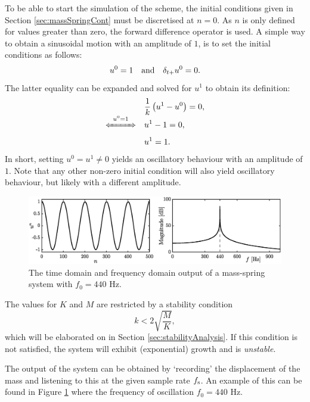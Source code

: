 To be able to start the simulation of the scheme, the initial conditions given in Section \ref{sec:massSpringCont} must be discretised at $n=0$. As $n$ is only defined for values greater than zero, the forward difference operator is used. A simple way to obtain a sinusoidal motion with an amplitude of $1$, is to set the initial conditions as follows: 
%
\begin{equation}
    u^0 = 1 \quad \text{and} \quad \delta_{t+} u^0 = 0.
\end{equation}
The latter equality can be expanded and solved for $u^1$ to obtain its definition: 
\begin{align*}
    &\frac{1}{k}\left(u^1 - u^0\right) = 0,\\[-1em]
    \xLeftrightarrow{\mystrut\ u^0 = 1\ }\quad &u^1 - 1 = 0,\\[0.1em]
 &u^1 = 1.
\end{align*}
In short, setting $u^0 = u^1 \neq 0$ yields an oscillatory behaviour with an amplitude of $1$. Note that any other non-zero initial condition will also yield oscillatory behaviour, but likely with a different amplitude.

\begin{figure}[b]
    \includegraphics[width=\textwidth]{figures/fdtd/massSpringOutput.eps}
    \caption{The time domain and frequency domain output of a mass-spring system with $f_0 = 440$ Hz. \label{fig:massSpringOutput}}
\end{figure}

The values for $K$ and $M$ are restricted by a stability condition
\begin{equation}
    k < 2\sqrt{\frac{M}{K}},
\end{equation}
which will be elaborated on in Section \ref{sec:stabilityAnalysis}. If this condition is not satisfied, the system will exhibit (exponential) growth and is \textit{unstable}. 

The output of the system can be obtained by `recording' the displacement of the mass and listening to this at the given sample rate $f_\text{s}$. An example of this can be found in Figure \ref{fig:massSpringOutput} where the frequency of oscillation $f_0 = 440$ Hz.



